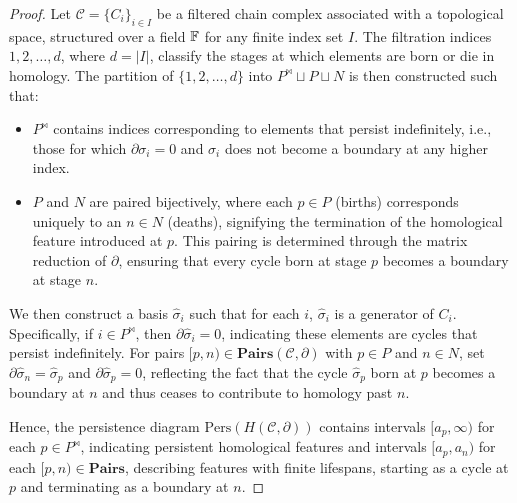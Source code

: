 \begin{proof}
	Let $\mathcal{C}= \{C_{i}\}_{i \in I}$ be a filtered chain complex associated with
	a topological space, structured over a field ${\mathbb{F}}$ for any finite index
	set $I$. The filtration indices ${1, 2, \ldots, d}$, where $d = \vert I \vert$,
	classify the stages at which elements are born or die in homology. The
	partition of $\{1, 2, \ldots, d\}$ into $P^{\Join} \sqcup P \sqcup N$ is then
	constructed such that:
	\begin{itemize}
		\item $P^{\Join}$ contains indices corresponding to elements that persist indefinitely,
			i.e., those for which $\partial\sigma_{i} = 0$ and $\sigma_{i}$ does not
			become a boundary at any higher index.

		\item $P$ and $N$ are paired bijectively, where each $p \in P$ (births)
			corresponds uniquely to an $n \in N$ (deaths), signifying the termination of
			the homological feature introduced at $p$. This pairing is determined
			through the matrix reduction of $\partial$, ensuring that every cycle born
			at stage $p$ becomes a boundary at stage $n$.
	\end{itemize}

	We then construct a basis ${\hat{\sigma}_i}$ such that for each $i$, $\hat{\sigma}
	_{i}$ is a generator of $C_{i}$. Specifically, if $i \in P^{\Join}$, then
	$\partial\hat{\sigma}_{i} = 0$, indicating these elements are cycles that persist
	indefinitely. For pairs $[p, n) \in \textbf{Pairs}(\mathcal{C}, \partial)$
	with $p \in P$ and $n \in N$, set $\partial\hat{\sigma}_{n} = \hat{\sigma}_{p}$
	and $\partial\hat{\sigma}_{p} = 0$, reflecting the fact that the cycle
	$\hat{\sigma}_{p}$ born at $p$ becomes a boundary at $n$ and thus ceases to
	contribute to homology past $n$.

	Hence, the persistence diagram $\mathrm{Pers}(H(\mathcal{C}, \partial))$ contains
	intervals $[a_{p}, \infty)$ for each $p \in P^{\Join}$, indicating persistent
	homological features and intervals $[a_{p}, a_{n})$ for each
	$[p, n) \in \textbf{Pairs}$, describing features with finite lifespans,
	starting as a cycle at $p$ and terminating as a boundary at $n$.
\end{proof}

